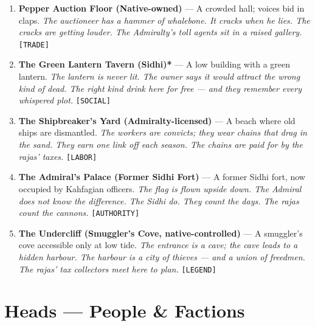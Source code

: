 \begin{enumerate}
\item \textbf{Pepper Auction Floor (Native-owned)\textdagger} --- A crowded hall; voices bid in claps.
  \hfill \textit{The auctioneer has a hammer of whalebone. It cracks when he lies. The cracks are getting louder. The Admiralty's toll agents sit in a raised gallery.} \texttt{[TRADE]}
\item[J] \textbf{The Green Lantern Tavern (Sidhi)*} --- A low building with a green lantern.
  \hfill \textit{The lantern is never lit. The owner says it would attract the wrong kind of dead. The right kind drink here for free --- and they remember every whispered plot.} \texttt{[SOCIAL]}
\item[Q] \textbf{The Shipbreaker's Yard (Admiralty-licensed)\textdaggerdbl} --- A beach where old ships are dismantled.
  \hfill \textit{The workers are convicts; they wear chains that drag in the sand. They earn one link off each season. The chains are paid for by the rajas' taxes.} \texttt{[LABOR]}
\item[K] \textbf{The Admiral's Palace (Former Sidhi Fort)\textdaggerdbl} --- A former Sidhi fort, now occupied by Kahfagian officers.
  \hfill \textit{The flag is flown upside down. The Admiral does not know the difference. The Sidhi do. They count the days. The rajas count the cannons.} \texttt{[AUTHORITY]}
\item[A] \textbf{The Undercliff (Smuggler's Cove, native-controlled)\textdagger} --- A smuggler's cove accessible only at low tide.
  \hfill \textit{The entrance is a cave; the cave leads to a hidden harbour. The harbour is a city of thieves --- and a union of freedmen. The rajas' tax collectors meet here to plan.} \texttt{[LEGEND]}
\end{enumerate}

\section*{Heads --- People \& Factions}
\label{sec:brasscoast-people}

